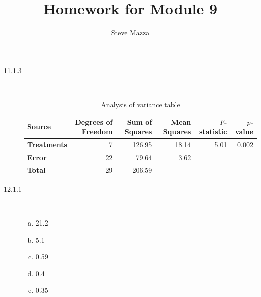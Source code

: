 \documentclass[letterpaper,10pt]{article}
\title{Homework for Module 9}
\author{Steve Mazza}
\begin{document}
\maketitle

\begin{description}
\item[11.1.3]\ 
\begin{table}[htdp]
\caption{Analysis of variance table}
\begin{center}
\begin{tabular}{l|rrrrr}
\textbf{Source} & \textbf{Degrees of Freedom} & \textbf{Sum of Squares} & \textbf{Mean Squares} & \textbf{$F$-statistic} & \textbf{$p$-value} \\
\hline \textbf{Treatments} & 7 & 126.95 & 18.14 & 5.01 & 0.002 \\
\textbf{Error} & 22 & 79.64 & 3.62 & & \\
\hline \textbf{Total} & 29 & 206.59 & & & 
\end{tabular}
\end{center}
\label{default}
\end{table}

\item[12.1.1]\ 
\begin{enumerate}[a)]
\item 21.2
\item 5.1
\item 0.59
\item 0.4
\item 0.35
\end{enumerate}


\end{description}
\end{document}
